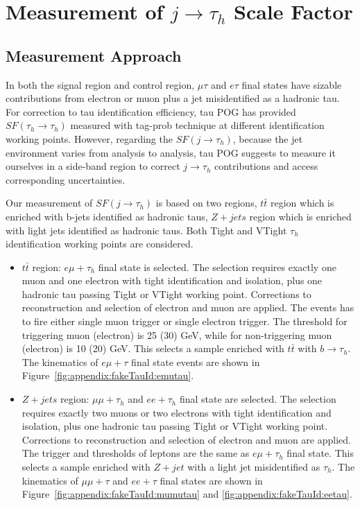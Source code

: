 

\section{Measurement of $j \to \tau_h$ Scale Factor}

\subsection{Measurement Approach}
In both the signal region and control region, $\mu \tau$ and $e \tau$
final states have sizable contributions from electron or muon plus a jet
misidentified as a hadronic tau.  For correction to tau identification
efficiency, tau POG has provided $SF (\tau_h \to \tau_h)$ measured with
tag-prob technique at different identification working points.  However,
regarding the $SF (j \to \tau_h)$, because the jet environment varies from
analysis to analysis, tau POG suggests to measure it ourselves in a
side-band region to correct $j \to \tau_h$ contributions and access
corresponding uncertainties.

Our measurement of $SF (j\to \tau_h)$ is based on two regions,
$t\bar{t}$ region which is enriched with b-jets identified as hadronic
taus, $Z+jets$ region which is enriched with light jets identified as
hadronic taus. Both Tight and VTight $\tau_h$ identification working points
are considered.

\begin{itemize}
    \item $t\bar{t}$ region: $e\mu+\tau_h$ final state is selected. The selection requires
    exactly one muon and one electron with tight identification and
    isolation, plus one hadronic tau passing Tight or VTight working point.
    Corrections to reconstruction and selection of electron and muon are
    applied. The events has to fire either single muon trigger or single electron
    trigger.  The \pt threshold for triggering muon (electron) is 25 (30)
    GeV, while for non-triggering muon (electron) is 10 (20) GeV.  This
    selects a sample enriched with $t\bar{t}$ with $b \to \tau_h$. The kinematics of $e\mu+\tau$ final
    state events are shown in Figure~\ref{fig:appendix:fakeTauId:emutau}.
    
    
    \item $Z+jets$ region: $\mu\mu+\tau_h$ and $ee+\tau_h$ final state are selected.  The
    selection requires exactly two muons or two electrons with tight
    identification and isolation, plus one hadronic tau passing Tight or VTight
    working point.  Corrections to reconstruction and selection of
    electron and muon are applied.
    The trigger and \pt thresholds of leptons are the same as
    $e\mu+\tau_h$ final state.  This selects a sample enriched with $Z +
    jet$ with a light jet misidentified as $\tau_h$. The kinematics of $\mu\mu+\tau$ and
    $ee+\tau$ final states are shown in Figure~\ref{fig:appendix:fakeTauId:mumutau} and \ref{fig:appendix:fakeTauId:eetau}.
\end{itemize}

